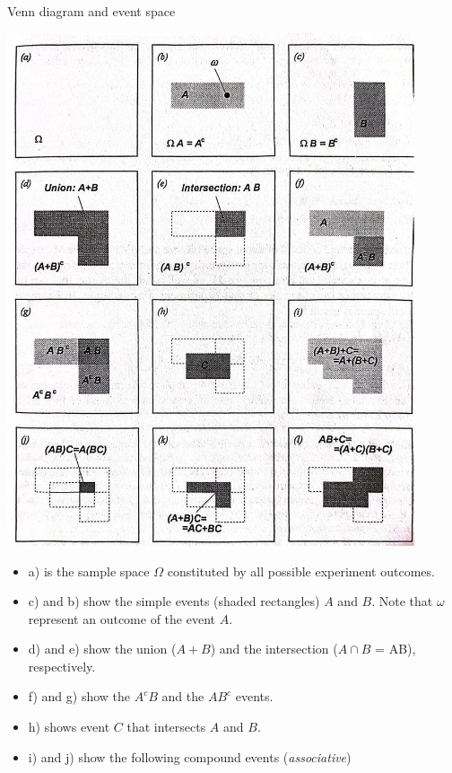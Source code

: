 \documentclass[8pt]{beamer}
\begin{document}
\begin{frame}{Venn diagram and event space}

    \begin{minipage}{0.59\textwidth}
        \includegraphics[width=0.9\textwidth]{fi216.jpeg}
    \end{minipage}
    \hfill
    \begin{minipage}{0.39\textwidth}
        \begin{itemize}
            \small
            \item a) is the sample space $\Omega$ constituted by all possible experiment outcomes.
            \item c) and b) show the simple events (shaded rectangles) $A$ and $B$. Note that $\omega$ represent an outcome of the event $A$.
            \item d) and e) show the union ($A+B$) and the intersection ($A \cap B$ = AB), respectively. 
            \item f) and g) show the $A^c B$ and the $A B^c$ events.
            \item h) shows event $C$ that intersects $A$ and $B$.
            \item i) and j) show the following compound events (\emph{associative})

\end{itemize}
\end{minipage}
\end{frame}
\end{document}
